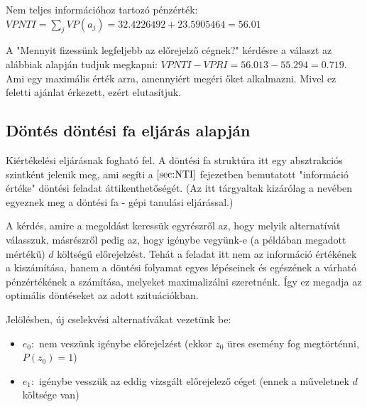 \documentclass[a4paper,12pt]{article}
\begin{document}
Nem teljes információhoz tartozó pénzérték: $VPNTI = \sum_{j} VP(a_j) = 32.4226492 + 23.5905464 = 56.01$

A "Mennyit fizessünk legfeljebb az előrejelző cégnek?" kérdésre a választ az alábbiak alapján tudjuk megkapni: $VPNTI - VPRI = 56.013 - 55.294 = 0.719$. Ami egy maximális érték arra, amennyiért megéri őket alkalmazni. Mivel ez feletti ajánlat érkezett, ezért elutasítjuk.

\subsection{Döntés döntési fa eljárás alapján}

Kiértékelési eljárásnak fogható fel. A döntési fa struktúra itt egy absztrakciós szintként jelenik meg, ami segíti a $\ref{sec:NTI}$ fejezetben bemutatott "információ értéke" döntési feladat áttikenthetőségét. (Az itt tárgyaltak kizárólag a nevében egyeznek meg a döntési fa - gépi tanulási eljárással.)

A kérdés, amire a megoldást keressük egyrészről az, hogy melyik alternatívát válasszuk, másrészről pedig az, hogy igénybe vegyünk-e (a példában megadott mértékű) $d$ költségű előrejelzést. Tehát a feladat itt nem az információ értékének a kiszámítása, hanem a döntési folyamat egyes lépéseinek és egészének a várható pénzértékének a számítása, melyeket maximalizálni szeretnénk. Így ez megadja az optimális döntéseket az adott szituációkban.

Jelölésben, új cselekvési alternatívákat vezetünk be: 
\begin{itemize}
\item $e_{0}:$ nem veszünk igénybe előrejelzést (ekkor $z_{0}$ üres esemény fog megtörténni, $P(z_0) = 1$)
\item $e_{1}:$ igénybe vesszük az eddig vizsgált előrejelező céget (ennek a műveletnek $d$ költsége van)
\end{itemize}
\end{document}

